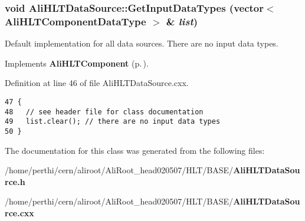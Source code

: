 \subsubsection{\setlength{\rightskip}{0pt plus 5cm}void Ali\-HLTData\-Source::Get\-Input\-Data\-Types (vector$<$ {\bf Ali\-HLTComponent\-Data\-Type} $>$ \& {\em list})\hspace{0.3cm}{\tt  [virtual]}}\label{classAliHLTDataSource_a4}


Default implementation for all data sources. There are no input data types. 

Implements {\bf Ali\-HLTComponent} {\rm (p.\,\pageref{classAliHLTComponent_a10})}.

Definition at line 46 of file Ali\-HLTData\-Source.cxx.

\footnotesize\begin{verbatim}47 {
48   // see header file for class documentation
49   list.clear(); // there are no input data types
50 }
\end{verbatim}\normalsize 




The documentation for this class was generated from the following files:\begin{CompactItemize}
\item 
/home/perthi/cern/aliroot/Ali\-Root\_\-head020507/HLT/BASE/{\bf Ali\-HLTData\-Source.h}\item 
/home/perthi/cern/aliroot/Ali\-Root\_\-head020507/HLT/BASE/{\bf Ali\-HLTData\-Source.cxx}\end{CompactItemize}
